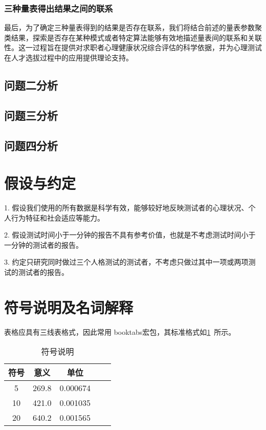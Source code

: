 \documentclass[withoutpreface,bwprint]{cumcmthesis} %
\begin{document}
\subsubsection*{三种量表得出结果之间的联系}

最后，为了确定三种量表得到的结果是否存在联系，我们将结合前述的量表参数聚类结果，探索是否存在某种模式或者特定算法能够有效地描述量表间的联系和关联性。这一过程旨在提供对求职者心理健康状况综合评估的科学依据，并为心理测试在人才选拔过程中的应用提供理论支持。

\subsection{问题二分析}

\subsection{问题三分析}

\subsection{问题四分析}

\section{假设与约定}
1. 假设我们使用的所有数据是科学有效，能够较好地反映测试者的心理状况、个人行为特征和社会适应等能力。

2. 假设测试时间小于一分钟的报告不具有参考价值，也就是不考虑测试时间小于一分钟的测试者的报告。

3. 约定只研究同时做过三个人格测试的测试者，不考虑只做过其中一项或两项测试的测试者的报告。

\section{符号说明及名词解释}
表格应具有三线表格式，因此常用 booktabs宏包，其标准格式如\cref{tab:001}~所示。
\begin{table}[!htbp]
    \caption{符号说明}\label{tab:001} \centering
    \begin{tabular}{ccccc}
        \toprule[1.5pt]
        符号 & 意义 & 单位 \\
        \midrule[1pt]
        5 & 269.8 & 0.000674 \\
        10 & 421.0 & 0.001035 \\
        20 & 640.2 & 0.001565 \\
        \bottomrule[1.5pt]
    \end{tabular}
\end{table}
\end{document}
